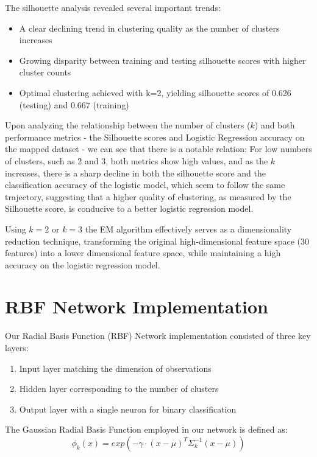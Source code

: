 \documentclass[11pt]{article}
\begin{document}
The silhouette analysis revealed several important trends:
\begin{itemize}
    \item A clear declining trend in clustering quality as the number of clusters increases
    \item Growing disparity between training and testing silhouette scores with higher cluster counts
    \item Optimal clustering achieved with k=2, yielding silhouette scores of 0.626 (testing) and 0.667 (training)
\end{itemize}

Upon analyzing the relationship between the number of clusters 
($k$) and both performance metrics - the Silhouette scores and
Logistic Regression accuracy on the mapped dataset - we can see
that there is a notable relation: For low numbers of clusters,
such as 2 and 3, both metrics show high values, and as the $k$
increases, there is a sharp decline in both the silhouette score
and the classification accuracy of the logistic model, which
seem to follow the same trajectory, suggesting that a higher
quality of clustering, as measured by the Silhouette score, is
conducive to a better logistic regression model.

Using $k=2$ or $k=3$ the EM algorithm effectively serves as a
dimensionality reduction technique, transforming the original
high-dimensional feature space (30 features) into a lower
dimensional feature space, while maintaining a high accuracy
on the logistic regression model.

\section{RBF Network Implementation}

Our Radial Basis Function (RBF) Network implementation consisted of three key layers:
\begin{enumerate}
    \item Input layer matching the dimension of observations
    \item Hidden layer corresponding to the number of clusters
    \item Output layer with a single neuron for binary classification
\end{enumerate}

The Gaussian Radial Basis Function employed in our network is defined as:
\begin{equation}
  \phi_k(x)=exp(-\gamma \cdot (x-\mu)^T\Sigma_k^{-1}(x-\mu))
\end{equation}
\end{document}
